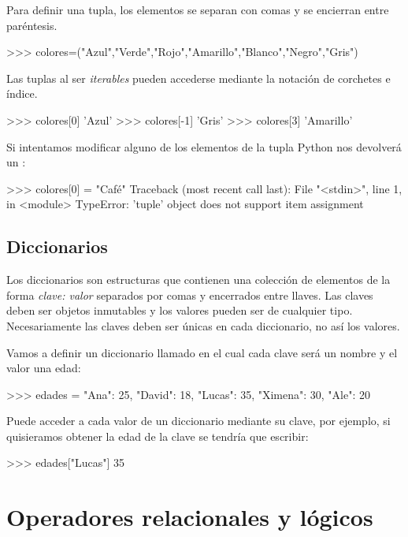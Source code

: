 Para definir una tupla, los elementos se separan con comas y se encierran entre paréntesis.

\begin{python}
>>> colores=("Azul","Verde","Rojo","Amarillo","Blanco","Negro","Gris")
\end{python}

Las tuplas al ser \textit{iterables} pueden accederse mediante la notación de corchetes e índice.

\begin{python}
>>> colores[0]
'Azul'
>>> colores[-1]
'Gris'
>>> colores[3]
'Amarillo'
\end{python}

Si intentamos modificar alguno de los elementos de la tupla Python nos devolverá un :

\begin{python}
>>> colores[0] = "Café"
Traceback (most recent call last):
  File "<stdin>", line 1, in <module>
TypeError: 'tuple' object does not support item assignment
\end{python}


\subsection{Diccionarios}

Los diccionarios son estructuras que contienen una colección de elementos de la 
forma \textit{clave: valor} separados por comas y encerrados entre llaves. 
Las claves deben ser objetos inmutables y los valores pueden ser de cualquier tipo. 
Necesariamente las claves deben ser únicas en cada diccionario, no así 
los valores. 

Vamos a definir un diccionario llamado  en el cual 
cada clave será un nombre y el valor una edad:

\begin{python}
>>> edades = {"Ana": 25, "David": 18, "Lucas": 35, "Ximena": 30, "Ale": 20}
\end{python}

Puede acceder a cada valor de un diccionario mediante su clave, por ejemplo, 
si quisieramos obtener la edad de la clave  se tendría que escribir:

\begin{python}
>>> edades["Lucas"]
35
\end{python}


\section{Operadores relacionales y lógicos}


